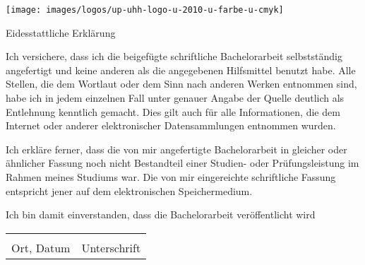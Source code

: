 \documentclass{scrreport}
\begin{document}
\texttt{[image: images/logos/up-uhh-logo-u-2010-u-farbe-u-cmyk]}\par
\vspace{4\baselineskip}

{\centering \huge Eidesstattliche Erklärung\par}

\vspace{1cm}

Ich versichere, dass ich die beigefügte schriftliche Bachelorarbeit selbstständig angefertigt und keine anderen als die angegebenen Hilfsmittel benutzt habe.
Alle Stellen, die dem Wortlaut oder dem Sinn nach anderen Werken entnommen sind, habe ich in jedem einzelnen Fall unter genauer Angabe der Quelle deutlich als Entlehnung kenntlich gemacht.
Dies gilt auch für alle Informationen, die dem Internet oder anderer elektronischer Datensammlungen entnommen wurden.

Ich erkläre ferner, dass die von mir angefertigte Bachelorarbeit in gleicher oder ähnlicher Fassung noch nicht Bestandteil einer Studien- oder Prüfungsleistung im Rahmen meines Studiums war.
Die von mir eingereichte schriftliche Fassung entspricht jener auf dem elektronischen Speichermedium.

Ich bin damit einverstanden, dass die Bachelorarbeit veröffentlicht wird

\vspace{2cm}

\begin{tabular}{@{}p{5cm}p{8cm}@{}}
    \hrulefill & \hrulefill \\
    Ort, Datum & Unterschrift \\
\end{tabular}
    
\end{document}
